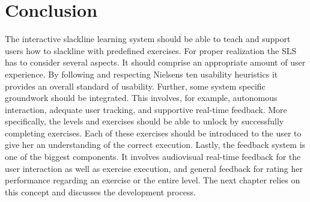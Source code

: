 \section{Conclusion}\label{4_7_conclusion}
The interactive slackline learning system should be able to teach and support users how to slackline with predefined exercises. For proper realization the SLS has to consider several aspects. It should comprise an appropriate amount of user experience. By following and respecting Nielsens ten usability heuristics it provides an overall standard of usability. Further, some system specific groundwork should be integrated. This involves, for example, autonomous interaction, adequate user tracking, and supportive real-time feedback. More specifically, the levels and exercises should be able to unlock by successfully completing exercises. Each of these exercises should be introduced to the user to give her an understanding of the correct execution. Lastly, the feedback system is one of the biggest components. It involves audiovisual real-time feedback for the user interaction as well as exercise execution, and general feedback for rating her performance regarding an exercise or the entire level. The next chapter \textit{} relies on this concept and discusses the development process.
